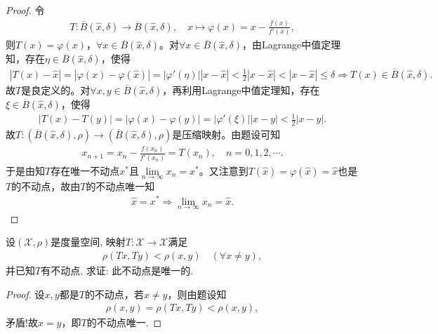 \documentclass[../../main.tex]{subfiles}%
\begin{document}
\begin{proof}
令
\begin{align*}
T:\overline{B}(\widehat{x},\delta)\to \overline{B}(\widehat{x},\delta),\quad x\mapsto \varphi(x)=x-\frac{f(x)}{f'(x)},
\end{align*}
则$T(x)=\varphi(x)$，$\forall x\in \overline{B}(\widehat{x},\delta)$。对$\forall x\in \overline{B}(\widehat{x},\delta)$，由Lagrange中值定理知，存在$\eta\in \overline{B}(\widehat{x},\delta)$，使得
\begin{align*}
|T(x)-\widehat{x}|=|\varphi(x)-\varphi(\widehat{x})|=|\varphi'(\eta)||x-\widehat{x}|<\frac{1}{2}|x-\widehat{x}|<|x-\widehat{x}|\leqslant \delta \Longrightarrow T(x)\in \overline{B}(\widehat{x},\delta).
\end{align*}
故$T$是良定义的。对$\forall x,y\in \overline{B}(\widehat{x},\delta)$，再利用Lagrange中值定理知，存在$\xi\in \overline{B}(\widehat{x},\delta)$，使得
\begin{align*}
|T(x)-T(y)|=|\varphi(x)-\varphi(y)|=|\varphi'(\xi)||x-y|<\frac{1}{2}|x-y|.
\end{align*}
故$T:(\overline{B}(\widehat{x},\delta),\rho)\to (\overline{B}(\widehat{x},\delta),\rho)$是压缩映射。由题设可知
\begin{align*}
x_{n+1}=x_n-\frac{f(x_n)}{f'(x_n)}=T(x_n),\quad n=0,1,2,\cdots.
\end{align*}
于是由知$T$存在唯一不动点$x^*$且$\lim\limits_{n\to\infty}x_n=x^*$。又注意到$T(\widehat{x})=\varphi(\widehat{x})=\widehat{x}$也是$T$的不动点，故由$T$的不动点唯一知
\begin{align*}
\widehat{x}=x^*\Longrightarrow \lim\limits_{n\to\infty}x_n=\widehat{x}.
\end{align*}

\end{proof}

\begin{example}
设$(\mathscr{X},\rho)$是度量空间, 映射$T:\mathscr{X}\to\mathscr{X}$满足
\begin{align*}
\rho(Tx,Ty)<\rho(x,y)\quad (\forall x\neq y),
\end{align*}
并已知$T$有不动点, 求证: 此不动点是唯一的.
\end{example}
\begin{proof}

设$x,y$都是$T$的不动点，若$x\neq y$，则由题设知
\begin{align*}
\rho(x,y)=\rho(Tx,Ty)<\rho(x,y),
\end{align*}
矛盾!故$x=y$，即$T$的不动点唯一.

\end{proof}
\end{document}
